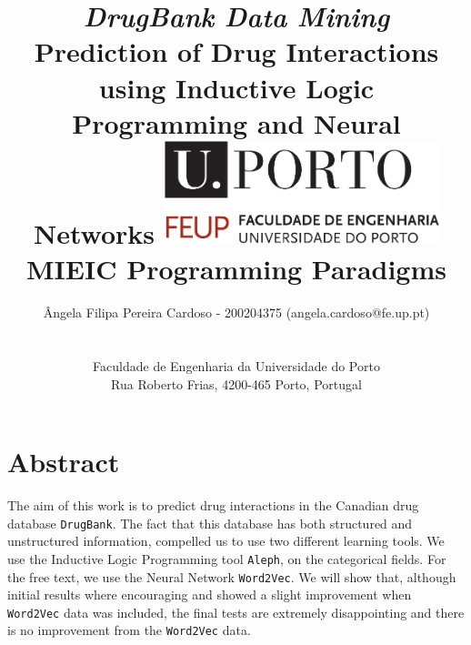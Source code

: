 \documentclass[12pt, openany]{book}
\begin{document}
\newcommand{\drugbank}{\texttt{DrugBank}\xspace}
\newcommand{\alephilp}{\texttt{Aleph}\xspace}
\newcommand{\wordvec}{\texttt{Word2Vec}\xspace}
\newcommand{\python}{\texttt{Python}\xspace}
\newcommand{\prolog}{\texttt{Prolog}\xspace}
\newcommand{\swi}{\texttt{SWI-Prolog}\xspace}
\newcommand{\yap}{\texttt{YAP}\xspace}
\newcommand{\xml}{\texttt{XML}\xspace}
\newcommand{\tensorflow}{\texttt{TensorFlow}\xspace}
\newcommand{\numpy}{\texttt{NumPy}\xspace}



\title{\Huge{\textbf{\textit{DrugBank Data Mining}}}\linebreak
\Large\textbf{\\Prediction of Drug Interactions using \linebreak Inductive Logic Programming \linebreak and Neural Networks}
\linebreak\linebreak\linebreak
\includegraphics[width=8cm]{feup.pdf}\linebreak \linebreak
\large{MIEIC} \linebreak
\large{Programming Paradigms}\linebreak
}
\author{
Ângela Filipa Pereira Cardoso - 200204375 (angela.cardoso@fe.up.pt)\\
\\
\\ Faculdade de Engenharia da Universidade do Porto \\ Rua Roberto Frias, 4200-465 Porto, Portugal
 \vspace{1cm}}
\maketitle
\thispagestyle{empty}

 
\chapter*{Abstract} 
The aim of this work is to predict drug interactions in the Canadian drug database \drugbank. The fact that this database has both structured and unstructured information, compelled us to use two different learning tools. We use the Inductive Logic Programming tool \alephilp, on the categorical fields. For the free text, we use the Neural Network \wordvec. We will show that, although initial results where encouraging and showed a slight improvement when \wordvec data was included, the final tests are extremely disappointing and there is no improvement from the \wordvec data. 
\end{document}
